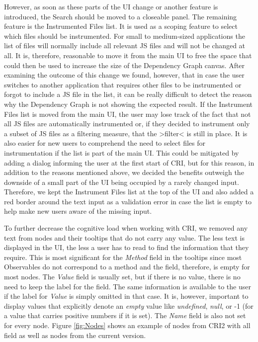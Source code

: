  However, as soon as these parts of the UI change or another feature is introduced, the Search should be moved to a closeable panel. The remaining feature is the Instrumented Files list. It is used as a scoping feature to select which files should be instrumented. For small to medium-sized applications the list of files will normally include all relevant JS files and will not be changed at all. It is, therefore, reasonable to move it from the main UI to free the space that could then be used to increase the size of the Dependency Graph canvas. After examining the outcome of this change we found, however, that in case the user switches to another application that requires other files to be instrumented or forgot to include a JS file in the list, it can be really difficult to detect the reason why the Dependency Graph is not showing the expected result. If the Instrument Files list is moved from the main UI, the user may lose track of the fact that not all JS files are automatically instrumented or, if they decided to instrument only a subset of JS files as a filtering measure, that the >filter< is still in place. It is also easier for new users to comprehend the need to select files for instrumentation if the list is part of the main UI. This could be mitigated by adding a dialog informing the user at the first start of CRI, but for this reason, in addition to the reasons mentioned above, we decided the benefits outweigh the downside of a small part of the UI being occupied by a rarely changed input. Therefore, we kept the Instrument Files list at the top of the UI and also added a red border around the text input as a validation error in case the list is empty to help make new users aware of the missing input.

To further decrease the cognitive load when working with CRI, we removed any text from nodes and their tooltips that do not carry any value. The less text is displayed in the UI, the less a user has to read to find the information that they require.%
 This is most significant for the \emph{Method} field in the tooltips since most Observables do not correspond to a method and the field, therefore, is empty for most nodes. The \emph{Value} field is usually set, but if there is no value, there is no need to keep the label for the field. The same information is available to the user if the label for \emph{Value} is simply omitted in that case.
It is, however, important to display values that explicitly denote an \emph{empty} value like \emph{undefined}, \emph{null}, or -1 (for a value that carries positive numbers if it is set). The \emph{Name} field is also not set for every node. Figure \ref{fig:Nodes} shows an example of nodes from CRI2 with all field as well as nodes from the current version.


